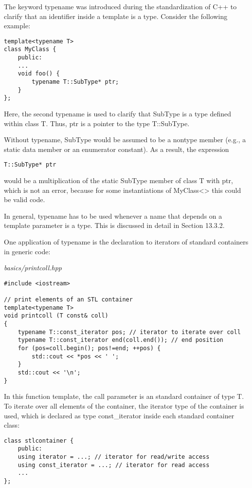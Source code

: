 The keyword typename was introduced during the standardization of C++ to clarify that an identifier inside a template is a type. Consider the following example:

\begin{lstlisting}[style=styleCXX]
template<typename T>
class MyClass {
	public:
	...
	void foo() {
		typename T::SubType* ptr;
	}
};
\end{lstlisting}

Here, the second typename is used to clarify that SubType is a type defined within class T. Thus, ptr is a pointer to the type T::SubType.

Without typename, SubType would be assumed to be a nontype member (e.g., a static data member or an enumerator constant). As a result, the expression

\begin{lstlisting}[style=styleCXX]
T::SubType* ptr
\end{lstlisting}

would be a multiplication of the static SubType member of class T with ptr, which is not an error, because for some instantiations of MyClass<> this could be valid code.

In general, typename has to be used whenever a name that depends on a template parameter is a type. This is discussed in detail in Section 13.3.2.

One application of typename is the declaration to iterators of standard containers in generic code:

\noindent
\textit{basics/printcoll.hpp}
\begin{lstlisting}[style=styleCXX]
#include <iostream>

// print elements of an STL container
template<typename T>
void printcoll (T const& coll)
{
	typename T::const_iterator pos; // iterator to iterate over coll
	typename T::const_iterator end(coll.end()); // end position
	for (pos=coll.begin(); pos!=end; ++pos) {
		std::cout << *pos << ' ';
	}
	std::cout << '\n';
}
\end{lstlisting}

In this function template, the call parameter is an standard container of type T. To iterate over all elements of the container, the iterator type of the container is used, which is declared as type const\_iterator inside each standard container class:

\begin{lstlisting}[style=styleCXX]
class stlcontainer {
	public:
	using iterator = ...; // iterator for read/write access
	using const_iterator = ...; // iterator for read access
	...
};
\end{lstlisting}

